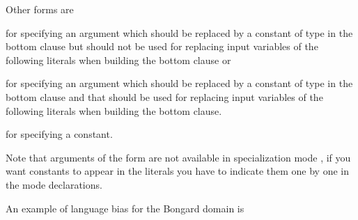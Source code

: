 \documentclass[letterpaper,10pt,english]{sphinxmanual}
\begin{document}
\sphinxAtStartPar
Other forms are

\begin{sphinxVerbatim}[commandchars=\\\{\}]
\end{sphinxVerbatim}

\sphinxAtStartPar
for specifying an argument which should be replaced by a constant of type  in the bottom clause but should not be used for replacing input variables of the following literals when building the bottom clause or

\begin{sphinxVerbatim}[commandchars=\\\{\}]
\end{sphinxVerbatim}

\sphinxAtStartPar
for specifying an argument which should be replaced by a constant of type  in the bottom clause and that should be used for replacing input variables of the following literals when building the bottom clause.

\begin{sphinxVerbatim}[commandchars=\\\{\}]
\end{sphinxVerbatim}

\sphinxAtStartPar
for specifying a constant.

\sphinxAtStartPar
Note that arguments of the form   are not available in specialization mode , if you want constants to appear in the literals you have to indicate them one by one in the mode declarations.

\sphinxAtStartPar
An example of language bias for the Bongard domain is
\end{document}
